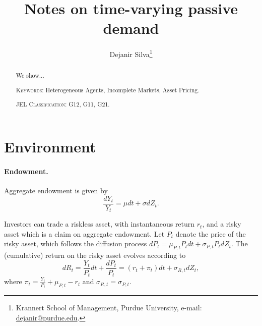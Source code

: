 \usepackage[en-US]{datetime2}
\usepackage{mathtools}
\usepackage{xcolor}

\newcommand{\comments}[1]
{\par {\bfseries \color{blue} #1 \par}}

\usepackage[draft]{todonotes}

\title{\textbf{Notes on time-varying passive demand}}
\author{ Dejanir Silva\thanks{Krannert School of Management, Purdue University, e-mail: \href{dejanir@purdue.edu}{dejanir@purdue.edu}.}}

	\sloppy
	\maketitle
	\thispagestyle{empty}
	
\begin{abstract} 
	\noindent We show...
	\vspace{10mm}	
	\bigskip
	
	\noindent	
	\textsc{Keywords}: Heterogeneous Agents, Incomplete Markets, Asset Pricing.
	
	\medskip
	\noindent
	\textsc{JEL Classification}: G12, G11, G21.		
\end{abstract}
	
\newpage
\doublespacing
\setcounter{page}{1}
	
\doublespacing

\section{Environment}

\paragraph{Endowment.} Aggregate endowment is given by
\begin{equation}
    \frac{d Y_t}{Y_t} = \mu dt + \sigma d Z_t. 
\end{equation}

Investors can trade a riskless asset, with instantaneous return $r_t$, and a risky asset which is a claim on aggregate endowment. Let $P_t$ denote the price of the risky asset, which follows the diffusion process $d P_t = \mu_{P,t} P_t dt + \sigma_{P,t} P_t dZ_t$. The (cumulative) return on the risky asset evolves according to
\begin{equation}
    d R_t = \frac{Y_t}{P_t} dt + \frac{d P_t}{P_t} = \left( r_t + \pi_t \right) dt + \sigma_{R,t} d Z_t,
\end{equation}
where $\pi_t = \frac{Y_t}{P_t} + \mu_{P,t} - r_t$ and $\sigma_{R,t} = \sigma_{P,t}$.

